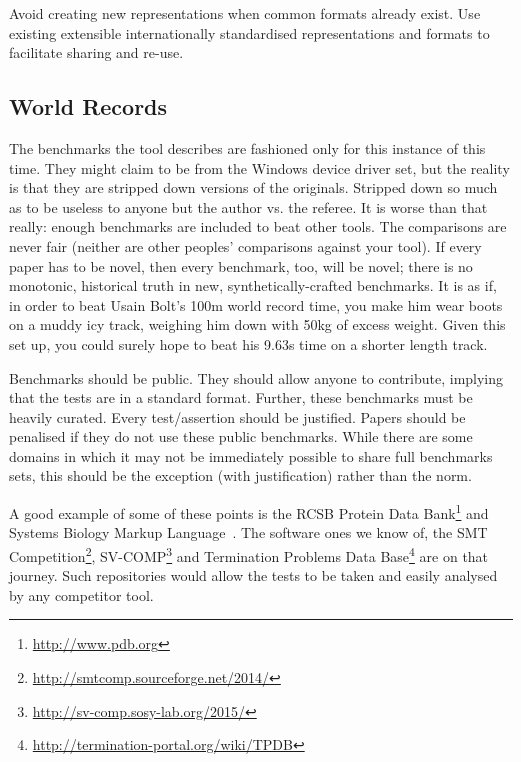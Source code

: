 \documentclass[10pt,conference,final]{IEEEtran}
\begin{document}
 Avoid creating
new representations when common formats already exist. Use existing
extensible internationally standardised representations and formats to
facilitate sharing and re-use.

\subsection{World Records}

The benchmarks the tool describes are fashioned only for this instance
of this time. They might claim to be from the Windows device driver
set, but the reality is that they are stripped down versions of the
originals. Stripped down so much as to be useless to anyone but the
author vs. the referee. It is worse than that really: enough
benchmarks are included to beat other tools. The comparisons are never
fair (neither are other peoples' comparisons against your tool). If
every paper has to be novel, then every benchmark, too, will be novel;
there is no monotonic, historical truth in new, synthetically-crafted
benchmarks. It is as if, in order to beat Usain Bolt's
\num{100}\si{\metre} world record time, you make him wear boots on a
muddy icy track, weighing him down with \num{50}\si{\kilogram} of
excess weight. Given this set up, you could surely hope to beat his
\num{9.63}\si{\second} time on a shorter length track.

 Benchmarks should
be public. They should allow anyone to contribute, implying that the
tests are in a standard format. Further, these benchmarks must be
heavily curated. Every test/assertion should be justified. Papers
should be penalised if they do not use these public benchmarks. While
there are some domains in which it may not be immediately possible to
share full benchmarks sets, this should be the exception (with
justification) rather than the norm.

A good example of some of these points is the RCSB Protein Data
Bank\footnote{\url{http://www.pdb.org}} and Systems Biology Markup
Language~\cite{Chaouiya2013}. The software ones we know of,
the SMT
Competition\footnote{\url{http://smtcomp.sourceforge.net/2014/}},
SV-COMP\footnote{\url{http://sv-comp.sosy-lab.org/2015/}} and
Termination Problems Data
Base\footnote{\url{http://termination-portal.org/wiki/TPDB}} are on
that journey. Such repositories would allow the tests to be taken and
easily analysed by any competitor tool.
\end{document}
